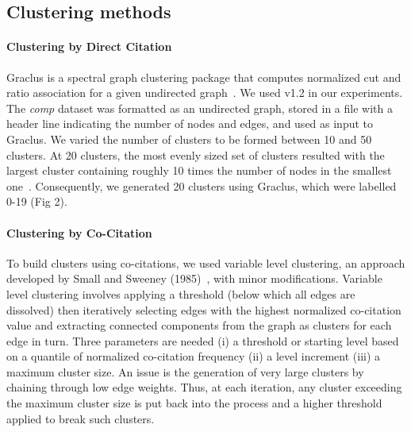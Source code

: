 \subsection{Clustering methods}

\paragraph{Clustering by Direct Citation} Graclus is a spectral graph clustering package that computes normalized cut and ratio association for a given undirected graph~\cite{graclus_2007}.  We used v1.2 in our experiments.
The \emph{comp} dataset was formatted as an undirected graph, stored in a file with a header line indicating the number of nodes and edges, and used as input to Graclus. We varied the number of clusters to be formed between 10 and 50 clusters. At 20 clusters, the most evenly sized set of clusters resulted with the largest cluster containing roughly 10 times the number of nodes in the smallest one~\cite{traag_louvain_2019}. Consequently, we generated 20 clusters using Graclus, which were labelled 0-19 (Fig 2).

\paragraph{Clustering by Co-Citation} To build clusters using co-citations, we used variable level clustering, an approach developed by Small and Sweeney (1985)~\cite{small_clustering_1985}, with minor modifications. Variable level clustering involves applying a threshold (below which all edges are dissolved) then iteratively selecting edges with the highest normalized co-citation value and extracting connected components from the graph as clusters for each edge in turn. Three parameters are needed (i) a threshold or starting level based on a quantile of normalized co-citation frequency (ii) a level increment (iii) a maximum cluster size. An issue is the generation of very large clusters by chaining through low edge weights.  Thus, at each iteration, any cluster exceeding the maximum cluster size is put back into the process and a higher threshold applied to break such clusters.

